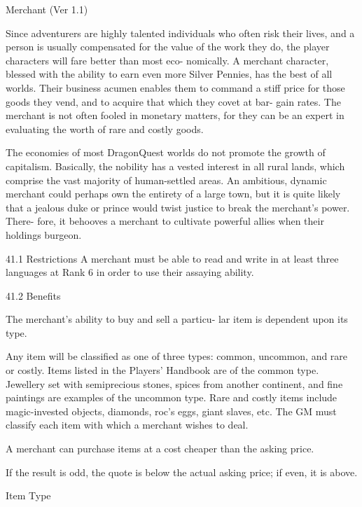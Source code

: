 \begin{Chapter}{Merchant (Ver 1.1)}

Since  adventurers  are  highly  talented  individuals 
who  often  risk  their  lives,  and  a  person  is  usually 
compensated for the value of the work they do, the 
player  characters  will  fare  better  than  most  eco-
nomically.  A  merchant  character,  blessed  with  the 
ability  to  earn  even  more  Silver  Pennies,  has  the 
best  of  all  worlds.  Their  business  acumen  enables 
them to command a stiff price for those goods they 
vend,  and  to  acquire  that  which  they  covet  at  bar-
gain  rates.  The  merchant  is  not  often  fooled  in 
monetary  matters,  for  they  can  be  an  expert  in 
evaluating the worth of rare and costly goods. 

The  economies  of  most  DragonQuest  worlds  do 
not  promote  the  growth  of  capitalism.  Basically, 
the nobility has a vested interest in all rural lands, 
which comprise the vast majority of human-settled 
areas.  An  ambitious,  dynamic  merchant  could 
perhaps  own  the  entirety  of  a  large  town,  but  it  is 
quite  likely  that  a  jealous  duke  or  prince  would 
twist justice to break the merchant’s power. There-
fore,  it  behooves  a  merchant  to  cultivate  powerful 
allies when their holdings burgeon. 

41.1 Restrictions 
A  merchant  must  be  able  to  read  and  write  in  at 
least three languages at Rank 6 in order to use their 
assaying ability. 

41.2 Benefits 

The merchant’s ability to buy and sell a particu-
lar item is dependent upon its type. 

Any  item  will  be  classified  as  one  of  three  types: 
common,  uncommon,  and  rare  or  costly.  Items 
listed in the Players’ Handbook are of the common 
type. Jewellery set with semiprecious stones, spices 
from  another  continent,  and  fine  paintings  are 
examples  of  the  uncommon  type.  Rare  and  costly 
items  include  magic-invested  objects,  diamonds, 
roc’s eggs, giant slaves, etc. The GM must classify 
each item with which a merchant wishes to deal. 

A  merchant  can  purchase  items  at  a  cost 
cheaper than the asking price. 

If  the  result  is  odd,  the  quote  is  below  the  actual 
asking price; if even, it is above. 

Item Type 


\end{Chapter}
